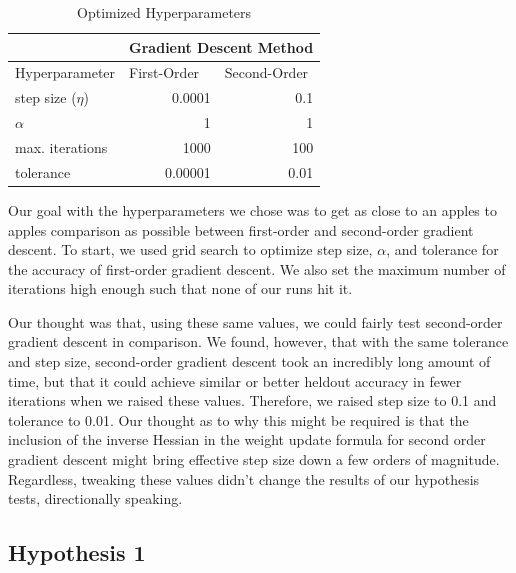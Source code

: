 \documentclass[11pt]{extarticle}
\begin{document}
\begin{center}
\begin{table}[h]
\centering
\caption{Optimized Hyperparameters}
\begin{tabular}{lrr}
\hline
                & \multicolumn{2}{l}{Gradient Descent Method}                          \\ 
\hline
\hline
Hyperparameter  & \multicolumn{1}{l}{First-Order~} & \multicolumn{1}{l}{Second-Order}  \\ 
\hline
step size ($\eta$) & 0.0001                           & 0.1                               \\
$\alpha$           & 1                                & 1                                 \\
max. iterations    & 1000                             & 100                              \\
tolerance          & 0.00001                          & 0.01                              \\
\hline
\end{tabular}
\end{table}
\end{center}

Our goal with the hyperparameters we chose was to get as close to an apples to apples comparison as possible between first-order and second-order gradient descent. To start, we used grid search to optimize step size, $\alpha$, and tolerance for the accuracy of first-order gradient descent. We also set the maximum number of iterations high enough such that none of our runs hit it. 

Our thought was that, using these same values, we could fairly test second-order gradient descent in comparison. We found, however, that with the same tolerance and step size, second-order gradient descent took an incredibly long amount of time, but that it could achieve similar or better heldout accuracy in fewer iterations when we raised these values. Therefore, we raised step size to 0.1 and tolerance to 0.01. Our thought as to why this might be required is that the inclusion of the inverse Hessian in the weight update formula for second order gradient descent might bring effective step size down a few orders of magnitude. Regardless, tweaking these values didn't change the results of our hypothesis tests, directionally speaking.

\newpage

\subsection{Hypothesis 1}
\end{document}
